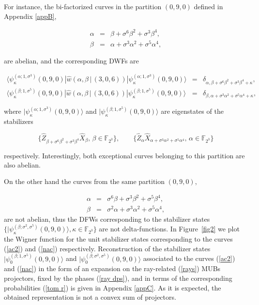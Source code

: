\documentclass[quantumrep,article,submit,pdftex,moreauthors]{Definitions/mdpi}
\begin{document}
For instance, the bi-factorized curves in the partition $(0,9,0)$ defined in
Appendix \ref{appB},

\begin{eqnarray}
  \alpha
  &=& \beta + \sigma^{6} \beta^{2} + \sigma^{3}\beta^{4},
  \label{ac1} \\
  \beta
  &=& \alpha + \sigma^{3} \alpha^{2} + \sigma^{5}\alpha^{4},
  \label{ac2}
\end{eqnarray}

are abelian, and the corresponding DWFs are

\begin{eqnarray}
  \langle \psi_{\kappa}^{(\alpha ; 1,\sigma^{3})}(0,9,0)
  |\hat{w}\left(\alpha,\beta \, | \, (3,0,6)\right)
  |\psi_{\kappa}^{(\alpha ; 1,\sigma^{3})}(0,9,0)\rangle
  &=& \delta_{\alpha, \beta + \sigma^{6}\beta^{2} + \sigma^{3} \beta^{4} + \kappa}, \\
  \langle \psi_{\kappa }^{(\beta ; 1,\sigma^{5})}(0,9,0)
  |\hat{w}\left(\alpha,\beta \, | \, (3,0,6)\right)
  |\psi_{\kappa}^{(\beta ; 1,\sigma^{5})}(0,9,0)\rangle
  &=& \delta_{\beta,\alpha + \sigma^{3}\alpha^{2} + \sigma^{5} \alpha^{4} + \kappa},
  \label{ac2 delta}
\end{eqnarray}

where $|\psi_{\kappa}^{(\alpha ; 1,\sigma^{3})}(0,9,0)\rangle$ and
$|\psi_{\kappa }^{(\beta ; 1,\sigma^{5})}(0,9,0)\rangle$ are eigenstates of the
stabilizers

\begin{equation*}
  \{\hat{Z}_{\beta + \sigma^{6}\beta ^{2}+\sigma^{3}\beta^{4}} \hat{X}_{\beta},
  \, \beta \in \mathbb{F}_{2^{3}}\},
  \qquad \{\hat{Z}_{\alpha } \hat{X}_{\alpha + \sigma^{3}\alpha^{2} + \sigma^{5}\alpha^{4}},
  \, \alpha \in \mathbb{F}_{2^{3}}\}
\end{equation*}

respectively. Interestingly, both exceptional curves belonging to this partition
are also abelian.

On the other hand the curves from the same partition $(0,9,0)$,

\begin{eqnarray}
  \alpha
  &=& \sigma^{6}\beta +\sigma^{3}\beta^{2}+\sigma^{5}\beta^{4},
  \label{nac1} \\
  \beta
  &=& \sigma^{2}\alpha +\sigma^{3}\alpha^{2}+\sigma^{5}\alpha^{4},
  \label{nac}
\end{eqnarray}
are not abelian, thus the DFWs corresponding to the stabilizer states
$\{|\psi_\kappa^{(\beta; \sigma^2, \sigma^{5})}(0,9,0)\rangle, \kappa \in
\mathbb F_{2^3}\}$ are not delta-functions. In Figure~\ref{fig2} we plot the
Wigner function for the unit stabilizer states corresponding to the curves
(\ref{ac2}) and (\ref{nac}) respectively. Reconstruction of the stabilizer
states $|\psi_{0}^{(\beta ; 1,\sigma^{5})}(0,9,0)\rangle$ and $|\psi_{0}^{(\beta
;\sigma^{2},\sigma^{5})}(0,9,0)\rangle$ associated to the curves (\ref{ac2})
and (\ref{nac}) in the form of an expansion on the ray-related (\ref{rays}) MUBs
projectors, fixed by the phases (\ref{ray dps}), and in terms of the
corresponding probabilities (\ref{tom r}) is given in Appendix \ref{appC}. As it
is expected, the obtained representation is not a convex sum of projectors.
\end{document}
